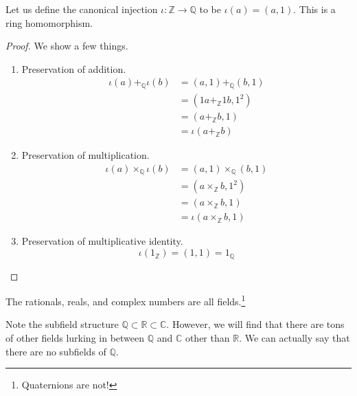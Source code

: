     \begin{theorem}
      Let us define the canonical injection $\iota: \mathbb{Z} \rightarrow \mathbb{Q}$ to be $\iota(a) = (a, 1)$. This is a ring homomorphism. 
    \end{theorem}
    \begin{proof} 
      We show a few things. 
      \begin{enumerate}
        \item Preservation of addition. 
          \begin{align}
            \iota(a) +_{\mathbb{Q}} \iota(b) & = (a, 1) +_{\mathbb{Q}} (b, 1) \\
                                             & = (1a +_{\mathbb{Z}} 1b, 1^2) \\
                                             & = (a +_{\mathbb{Z}} b, 1) \\
                                             & = \iota(a +_{\mathbb{Z}} b) 
          \end{align}
        \item Preservation of multiplication. 
          \begin{align}
            \iota(a) \times_{\mathbb{Q}} \iota(b) & = (a, 1) \times_{\mathbb{Q}} (b, 1) \\
                                                  & = (a \times_{\mathbb{Z}} b, 1^2) \\
                                                  & = (a \times_{\mathbb{Z}} b, 1) \\
                                                  & = \iota(a \times_{\mathbb{Z}} b, 1)
          \end{align}
        \item Preservation of multiplicative identity. 
          \begin{equation}
            \iota(1_{\mathbb{Z}}) = (1, 1) = 1_{\mathbb{Q}}
          \end{equation}
      \end{enumerate}
    \end{proof} 

    \begin{example}[Numbers]
      The rationals, reals, and complex numbers are all fields.\footnote{Quaternions are not!}
    \end{example}

    Note the subfield structure $\mathbb{Q} \subset \mathbb{R} \subset \mathbb{C}$. However, we will find that there are tons of other fields lurking in between $\mathbb{Q}$ and $\mathbb{C}$ other than $\mathbb{R}$. We can actually say that there are no subfields of $\mathbb{Q}$. 

